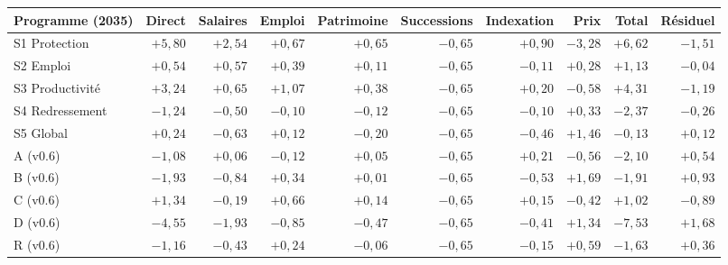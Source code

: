 \begin{tabular}{lrrrrrrrrr}\toprule Programme (2035) & Direct & Salaires & Emploi & Patrimoine & Successions & Indexation & Prix & Total & Résiduel\\ \midrule
S1 Protection & $+5{,}80$ & $+2{,}54$ & $+0{,}67$ & $+0{,}65$ & $-0{,}65$ & $+0{,}90$ & $-3{,}28$ & $+6{,}62$ & $-1{,}51$\\
S2 Emploi & $+0{,}54$ & $+0{,}57$ & $+0{,}39$ & $+0{,}11$ & $-0{,}65$ & $-0{,}11$ & $+0{,}28$ & $+1{,}13$ & $-0{,}04$\\
S3 Productivité & $+3{,}24$ & $+0{,}65$ & $+1{,}07$ & $+0{,}38$ & $-0{,}65$ & $+0{,}20$ & $-0{,}58$ & $+4{,}31$ & $-1{,}19$\\
S4 Redressement & $-1{,}24$ & $-0{,}50$ & $-0{,}10$ & $-0{,}12$ & $-0{,}65$ & $-0{,}10$ & $+0{,}33$ & $-2{,}37$ & $-0{,}26$\\
S5 Global & $+0{,}24$ & $-0{,}63$ & $+0{,}12$ & $-0{,}20$ & $-0{,}65$ & $-0{,}46$ & $+1{,}46$ & $-0{,}13$ & $+0{,}12$\\
A (v0.6) & $-1{,}08$ & $+0{,}06$ & $-0{,}12$ & $+0{,}05$ & $-0{,}65$ & $+0{,}21$ & $-0{,}56$ & $-2{,}10$ & $+0{,}54$\\
B (v0.6) & $-1{,}93$ & $-0{,}84$ & $+0{,}34$ & $+0{,}01$ & $-0{,}65$ & $-0{,}53$ & $+1{,}69$ & $-1{,}91$ & $+0{,}93$\\
C (v0.6) & $+1{,}34$ & $-0{,}19$ & $+0{,}66$ & $+0{,}14$ & $-0{,}65$ & $+0{,}15$ & $-0{,}42$ & $+1{,}02$ & $-0{,}89$\\
D (v0.6) & $-4{,}55$ & $-1{,}93$ & $-0{,}85$ & $-0{,}47$ & $-0{,}65$ & $-0{,}41$ & $+1{,}34$ & $-7{,}53$ & $+1{,}68$\\
R (v0.6) & $-1{,}16$ & $-0{,}43$ & $+0{,}24$ & $-0{,}06$ & $-0{,}65$ & $-0{,}15$ & $+0{,}59$ & $-1{,}63$ & $+0{,}36$\\\bottomrule\end{tabular}
